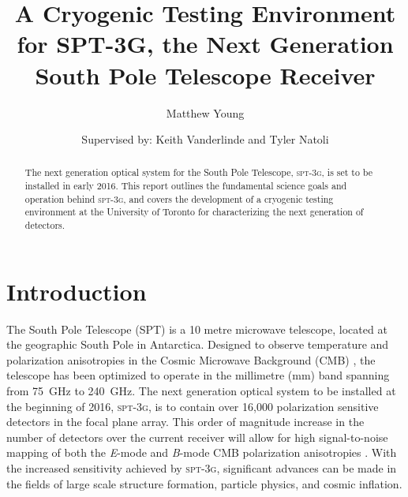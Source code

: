 \documentclass[iop]{emulateapj}
\begin{document}
\title{A Cryogenic Testing Environment for SPT-3G, the Next Generation South Pole Telescope Receiver}
\author{Matthew Young}
\author{Supervised by: Keith Vanderlinde and Tyler Natoli}

\begin{abstract}
The next generation optical system for the South Pole Telescope, \textsc{spt-3g}, is set to be installed in early 2016.  This report outlines the fundamental science goals and operation behind \textsc{spt-3g}, and covers the development of a cryogenic testing environment at the University of Toronto for characterizing the next generation of detectors.
\end{abstract}



\section{Introduction}

The South Pole Telescope (SPT) is a 10 metre microwave telescope, located at the geographic South Pole in Antarctica.  Designed to observe temperature and polarization anisotropies in the Cosmic Microwave Background (CMB) \citep{spt_collaboration_south_2004}, the telescope has been optimized to operate in the millimetre (mm) band spanning from 75~GHz to 240~GHz.
The next generation optical system to be installed at the beginning of 2016, \textsc{spt-3g}, is to contain over 16,000 polarization sensitive detectors in the focal plane array.  This order of magnitude increase in the number of detectors over the current receiver will allow for high signal-to-noise mapping of both the \textit{E}-mode and \textit{B}-mode CMB polarization anisotropies \citep{benson_spt-3g:_2014}. With the increased sensitivity achieved by \textsc{spt-3g}, significant advances can be made in the fields of large scale structure formation, particle physics, and cosmic inflation.
\end{document}
